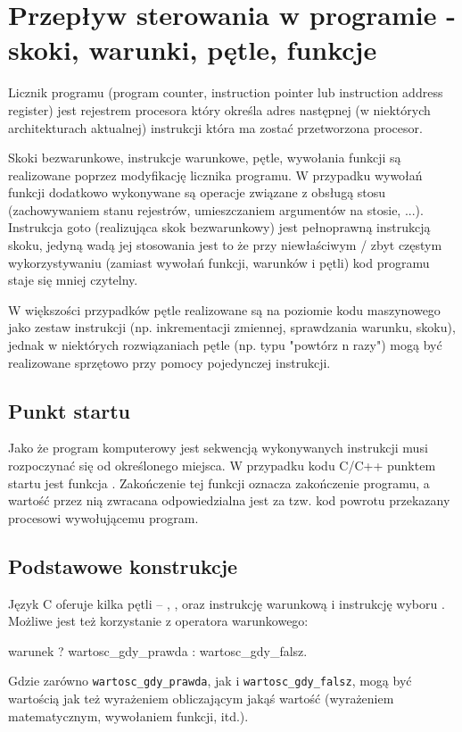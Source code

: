 \documentclass{pdfBooklets}
\begin{document}
\section{Przepływ sterowania w programie - skoki, warunki, pętle, funkcje}

Licznik programu (program counter, instruction pointer lub instruction address register) jest rejestrem procesora który określa adres następnej (w niektórych architekturach aktualnej) instrukcji która ma zostać przetworzona procesor.

Skoki bezwarunkowe, instrukcje warunkowe, pętle, wywołania funkcji są realizowane poprzez modyfikację licznika programu. W przypadku wywołań funkcji dodatkowo wykonywane są operacje związane z obsługą stosu (zachowywaniem stanu rejestrów, umieszczaniem argumentów na stosie, ...). Instrukcja goto (realizująca skok bezwarunkowy) jest pełnoprawną instrukcją skoku, jedyną wadą jej stosowania jest to że przy niewłaściwym / zbyt częstym wykorzystywaniu (zamiast wywołań funkcji, warunków i pętli) kod programu staje się mniej czytelny.

W większości przypadków pętle realizowane są na poziomie kodu maszynowego jako zestaw instrukcji (np. inkrementacji zmiennej, sprawdzania warunku, skoku), jednak w niektórych rozwiązaniach pętle (np. typu "powtórz n razy") mogą być realizowane sprzętowo przy pomocy pojedynczej instrukcji.

\subsection{Punkt startu}

Jako że program komputerowy jest sekwencją wykonywanych instrukcji musi rozpoczynać się od określonego miejsca.
W przypadku kodu C/C++ punktem startu jest funkcja . Zakończenie tej funkcji oznacza zakończenie programu, a wartość przez nią zwracana odpowiedzialna jest za tzw. kod powrotu przekazany procesowi wywołującemu program. 

\subsection{Podstawowe konstrukcje}

Język C oferuje kilka pętli – , ,  oraz instrukcję warunkową  i instrukcję wyboru .
Możliwe jest też korzystanie z operatora warunkowego:

\begin{CodeFrame*}[c]{}
warunek ? wartosc_gdy_prawda : wartosc_gdy_falsz.
\end{CodeFrame*}
Gdzie zarówno \Verb#wartosc_gdy_prawda#, jak i  \Verb#wartosc_gdy_falsz#, mogą być wartością jak też wyrażeniem obliczającym jakąś wartość (wyrażeniem matematycznym, wywołaniem funkcji, itd.).
\end{document}
